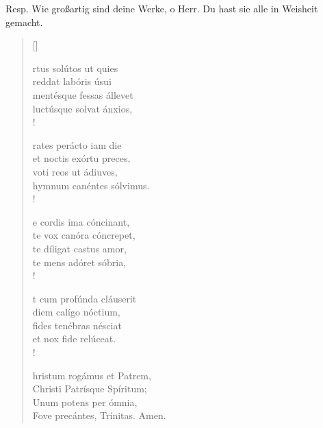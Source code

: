 



\def\greinitialformat#1{{\fontsize{40}{40}\selectfont #1}}
\resp


Resp. Wie großartig sind deine Werke, o Herr. Du hast sie alle in Weisheit gemacht.

\vspace{0.3cm}



\def\greinitialformat#1{{\fontsize{40}{40}\selectfont #1}}
\gresetfirstlineaboveinitial{\small \textcolor{red}{hieme}}{}
\setaboveinitialseparation{0.72mm}

\vspace{0.3cm}

\begin{verse}[\versewidth]
 


 
rtus solútos ut quies\\
reddat labóris úsui\\
mentésque fessas állevet\\
luctúsque solvat ánxios,\\!

rates perácto iam die\\
et noctis exórtu preces,\\ 
voti reos ut ádiuves,\\ 
hymnum canéntes sólvimus.\\!

e cordis ima cóncinant, \\
te vox canóra cóncrepet, \\
te díligat castus amor, \\
te mens adóret sóbria, \\!

t cum profúnda cláuserit\\
diem calígo nóctium,\\ 
fides tenébras nésciat\\
et nox fide relúceat.\\!

hristum rogámus et Patrem,\\ 
Christi Patrísque Spíritum;\\
Unum potens per ómnia,\\ 
Fove precántes, Trínitas. Amen.
\end{verse}

